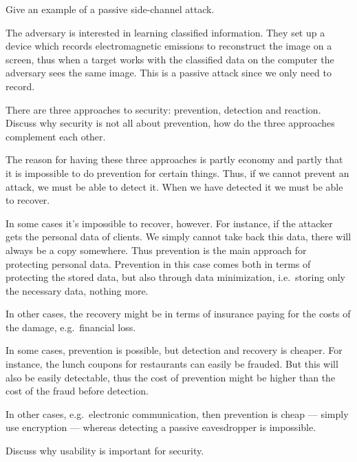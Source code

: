   
\question[3]\label{q:sidechannels}
Give an example of a passive side-channel attack.

\begin{solution}
  The adversary is interested in learning classified information.
  They set up a device which records electromagnetic emissions to reconstruct 
  the image on a screen, thus when a target works with the classified data on 
  the computer the adversary sees the same image.
  This is a passive attack since we only need to record.
\end{solution}


\question[3]
  There are three approaches to security: prevention, detection and reaction.
  Discuss why security is not all about prevention, how do the three approaches 
  complement each other.

  \begin{solution}
    The reason for having these three approaches is partly economy and partly 
    that it is impossible to do prevention for certain things.
    Thus, if we cannot prevent an attack, we must be able to detect it.
    When we have detected it we must be able to recover.

    In some cases it's impossible to recover, however.
    For instance, if the attacker gets the personal data of clients.
    We simply cannot take back this data, there will always be a copy somewhere.
    Thus prevention is the main approach for protecting personal data.
    Prevention in this case comes both in terms of protecting the stored data, 
    but also through data minimization, i.e.\ storing only the necessary data, 
    nothing more.

    In other cases, the recovery might be in terms of insurance paying for the 
    costs of the damage, e.g.\ financial loss.

    In some cases, prevention is possible, but detection and recovery is 
    cheaper.
    For instance, the lunch coupons for restaurants can easily be frauded.
    But this will also be easily detectable, thus the cost of prevention might 
    be higher than the cost of the fraud before detection.

    In other cases, e.g.\ electronic communication, then prevention is cheap --- 
    simply use encryption --- whereas detecting a passive eavesdropper is 
    impossible.
  \end{solution}
\question[3]
  Discuss why usability is important for security.


